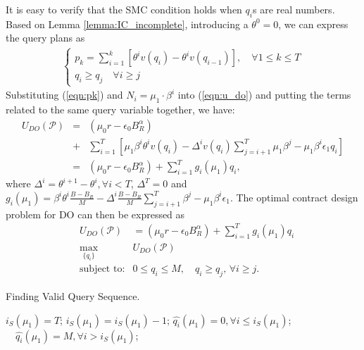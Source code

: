 \documentclass[journal]{IEEEtran}
\begin{document}
It is easy to verify that the SMC condition holds when $q_i$s are real numbers.
Based on Lemma \ref{lemma:IC_incomplete}, introducing a $\theta^0=0$, we can express the query plans as
\begin{eqnarray}
\label{eqn:pk}
\left\{
\begin{array}{l}
p_k=\sum_{i=1}^k \left[\theta^iv(q_i)-\theta^iv(q_{i-1})\right],\quad \forall 1\leq k\leq T\\
q_i\geq q_j \quad \forall i\geq j
\end{array}
\right.
\end{eqnarray}
Substituting (\ref{eqn:pk}) and $N_i=\mu_1\cdot\beta^i$ into (\ref{eqn:u_do}) and putting the terms related to the same query variable together, we have:
\begin{eqnarray*}
U_{DO}(\mathcal{P}) &=&(\mu_0r-\epsilon_0B_R^{\alpha}) \\
&+& \sum_{i=1}^T\left[
\mu_1\beta^i\theta^iv(q_i)-\Delta^iv(q_i)\sum_{j=i+1}^T\mu_1\beta^j - \mu_1\beta^i\epsilon_1q_i\right] \\
&=&(\mu_0r-\epsilon_0B_R^{\alpha}) + \sum_{i=1}^T g_i(\mu_1)q_i,
\end{eqnarray*}
where $\Delta^i=\theta^{i+1}-\theta^i,\forall i<T$, $\Delta^T=0$ and $g_i(\mu_1)=\beta^i\theta^i\frac{B-B_R}{M}-\Delta^i\frac{B-B_R}{M}\sum_{j=i+1}^T\beta^j - \mu_1\beta^i\epsilon_1$.
The optimal contract design problem for DO can then be expressed as
\begin{eqnarray}
&U_{DO}(\mathcal{P})&=(\mu_0r-\epsilon_0B_R^{\alpha}) + \sum_{i=1}^Tg_i(\mu_1)q_i \nonumber\\
&\max_{\{q_i\}}& U_{DO}(\mathcal{P}) \nonumber\\
&\textrm{subject to:}& 0\leq q_i\leq  M, \quad q_i\geq q_j,\,\forall i\geq j.
\end{eqnarray}

\begin{algorithm}[tp]
\caption {Finding Valid Query Sequence.}
\label{alg:valid_q}
\begin{algorithmic}[1]
\STATE $i_S(\mu_1)=T$;
\STATE $i_S(\mu_1)=i_S(\mu_1)-1$;
\ENDWHILE
\STATE $\hat{q_i}(\mu_1)=0, \forall i\leq i_S(\mu_1)$; $\quad \hat{q_i}(\mu_1)=M, \forall i> i_S(\mu_1)$;
\end{algorithmic}
\end{algorithm}
\end{document}
